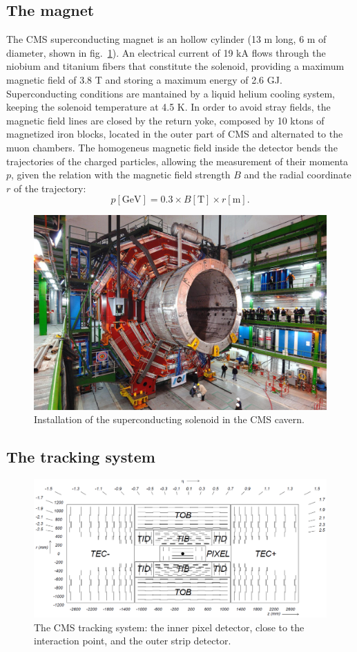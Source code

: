 \subsection{The magnet}
The CMS superconducting magnet is an hollow cylinder (13 m long, 6 m of diameter, shown in fig.~\ref{fig:CMS_solenoid}). An electrical current of 19 kA flows through the niobium and titanium fibers that constitute the solenoid, providing a maximum magnetic field of 3.8 T and storing a maximum energy of 2.6 GJ. Superconducting conditions are mantained by a liquid helium cooling system, keeping the solenoid temperature at 4.5 K. In order to avoid stray fields, the magnetic field lines are closed by the return yoke, composed by 10 ktons of magnetized iron blocks, located in the outer part of CMS and alternated to the muon chambers. The homogeneus magnetic field inside the detector bends the trajectories of the charged particles, allowing the measurement of their momenta $p$, given the relation with the magnetic field strength $B$ and the radial coordinate $r$ of the trajectory:
\begin{equation}
p [\text{GeV}] = 0.3 \times B [\text{T}] \times r [\text{m}]. 
\end{equation}

\begin{figure}[!htb]
  \centering
    \includegraphics[width=.5\textwidth]{figures/CMS_solenoid.jpeg}
  \caption{Installation of the superconducting solenoid in the CMS cavern.}
  \label{fig:CMS_solenoid}
\end{figure}

\subsection{The tracking system}
\begin{figure}[!htb]
  \centering
    \includegraphics[width=.9\textwidth]{figures/cmstracker.png}
  \caption{The CMS tracking system: the inner pixel detector, close to the interaction point, and the outer strip detector.}
  \label{fig:CMS_tracker}
\end{figure}

